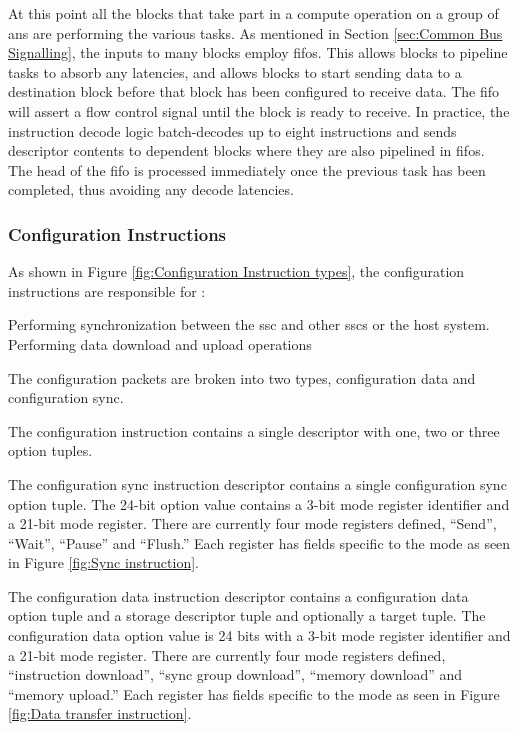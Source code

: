 At this point all the blocks that take part in a compute operation on a group of \acp{an} are performing the various tasks.
As mentioned in Section \ref{sec:Common Bus Signalling}, the inputs to many blocks employ \acp{fifo}. 
This allows blocks to pipeline tasks to absorb any latencies, and allows blocks to start sending data to a destination block before that block has been configured to receive data.
The \ac{fifo} will assert a flow control signal until the block is ready to receive.
In practice, the instruction decode logic batch-decodes up to eight instructions and sends descriptor contents to dependent blocks where they are also pipelined in \acp{fifo}.
The head of the \ac{fifo} is processed immediately once the previous task has been completed, thus avoiding any decode latencies.

\subsubsection{Configuration Instructions}
\label{sec:Decoding Configuration Instructions}

As shown in Figure \ref{fig:Configuration Instruction types}, the configuration instructions are responsible for :
\begin{outline}
 \1 Performing synchronization between the \ac{ssc} and other \acp{ssc} or the host system.
 \1 Performing data download and upload operations
\end{outline}

The configuration packets are broken into two types, configuration data and configuration sync.
\iffalse
Currently the sync instruction has been implemented.
It is assumed at this point that adequate infrastructure and extensibility has been built into the system to allow implementation without adding significant amounts of logic.
\fi

The configuration instruction contains a single descriptor with one, two or three option tuples.

The configuration sync instruction descriptor contains a single configuration sync option tuple. The 24-bit option value contains a 3-bit mode register identifier and a 21-bit mode register.
There are currently four mode registers defined, ``Send'', ``Wait'', ``Pause'' and ``Flush.'' Each register has fields specific to the mode as seen in Figure \ref{fig:Sync instruction}.

The configuration data instruction descriptor contains a configuration data option tuple and a storage descriptor tuple and optionally a target tuple. 
The configuration data option value is 24 bits with a 3-bit mode register identifier and a 21-bit mode register.
There are currently four mode registers defined, ``instruction download'', ``sync group download'', ``memory download'' and ``memory upload.''   Each register has fields specific to the mode as seen in Figure \ref{fig:Data transfer instruction}.

